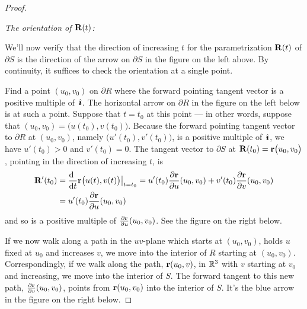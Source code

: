 \begin{proof}
{\begin{efig}
\begin{center}
\end{center}
\end{efig}
}

\noindent
\emph{The orientation of $\mathbf{R}(t)$:}\ \ \

We'll now verify that the direction of increasing $t$ for the parametrization 
$\mathbf{R}(t)$ of $\partial S$ is the direction of the arrow on $\partial S$ 
in the figure on the left above.
By continuity, it suffices to check the orientation at a single point.

Find a point $(u_0,v_0)$ on $\partial R$ where the forward pointing 
tangent vector is a positive multiple of $\,\hat{\pmb{\imath}}$. The horizontal 
arrow on $\partial R$ 
in the figure on the left below is at such a point. Suppose that 
$t=t_0$ at this point --- in other words, suppose 
that $(u_0,v_0)=\big(u(t_0),v(t_0)\big)$. 
Because  the forward pointing tangent vector to $\partial R$ at 
$(u_0,v_0)$, namely $\big(u'(t_0),v'(t_0)\big)$,
 is a positive multiple of $\,\hat{\pmb{\imath}}$, we have $u'(t_0)>0$ and 
$v'(t_0)=0$. 
The tangent vector to $\partial S$ at $ \mathbf{R}(t_0)=\mathbf{r}\big(u_0,v_0\big)$,
pointing in the direction of increasing $t$, is 
\begin{align*}
\vR'(t_0)&=\diff{\hfill}{t}\vr\big(u(t),v(t)\big)\big|_{t=t_0}
=u'(t_0)\frac{\partial \vr}{\partial u}(u_0,v_0)
+v'(t_0) \frac{\partial \vr}{\partial v}(u_0,v_0) \\
&=u'(t_0)\frac{\partial \vr}{\partial u}(u_0,v_0)
\end{align*}
and so is a positive multiple of $\frac{\partial \mathbf{r}}{\partial u}(u_0,v_0)$.
See the figure on the right below.
 
If we now walk along a path in the $uv$-plane which starts at $(u_0,v_0)$,
holds $u$ fixed at $u_0$ and increases $v$, we move into the interior of 
$R$ starting at $(u_0,v_0)$. Correspondingly, if we walk along the path,
$\mathbf{r}(u_0,v)$, in $\mathbb{R}^3$ with $v$ starting at $v_0$ and increasing,
we move into the interior of $S$. The forward tangent to this new path, 
$\frac{\partial \mathbf{r}}{\partial v}(u_0,v_0)$,
points from $ \mathbf{r}(u_0,v_0)$ into the interior of $S$. It's the blue arrow in
the figure on the right below.


\end{proof}
